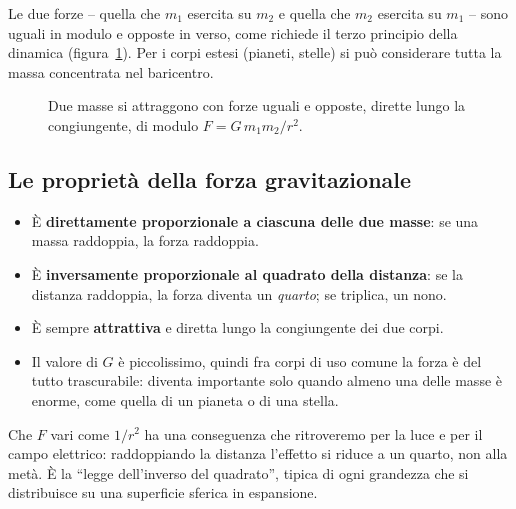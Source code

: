 Le due forze -- quella che $m_1$ esercita su $m_2$ e quella che $m_2$ esercita su $m_1$ -- sono uguali in modulo e opposte in verso, come richiede il terzo principio della dinamica (figura~\ref{fig:due-masse}). Per i corpi estesi (pianeti, stelle) si può considerare tutta la massa concentrata nel baricentro.

\begin{figure}[!htbp]
    \centering
    \caption{Due masse si attraggono con forze uguali e opposte, dirette lungo la congiungente, di modulo $F = G\,m_1 m_2 / r^2$.}
    \label{fig:due-masse}
\end{figure}

\subsection{Le proprietà della forza gravitazionale}
\begin{itemize}
    \item È \textbf{direttamente proporzionale a ciascuna delle due masse}: se una massa raddoppia, la forza raddoppia.
    \item È \textbf{inversamente proporzionale al quadrato della distanza}: se la distanza raddoppia, la forza diventa un \emph{quarto}; se triplica, un nono.
    \item È sempre \textbf{attrattiva} e diretta lungo la congiungente dei due corpi.
    \item Il valore di $G$ è piccolissimo, quindi fra corpi di uso comune la forza è del tutto trascurabile: diventa importante solo quando almeno una delle masse è enorme, come quella di un pianeta o di una stella.
\end{itemize}

\begin{remark}
Che $F$ vari come $1/r^2$ ha una conseguenza che ritroveremo per la luce e per il campo elettrico: raddoppiando la distanza l'effetto si riduce a un quarto, non alla metà. È la ``legge dell'inverso del quadrato'', tipica di ogni grandezza che si distribuisce su una superficie sferica in espansione.
\end{remark}

